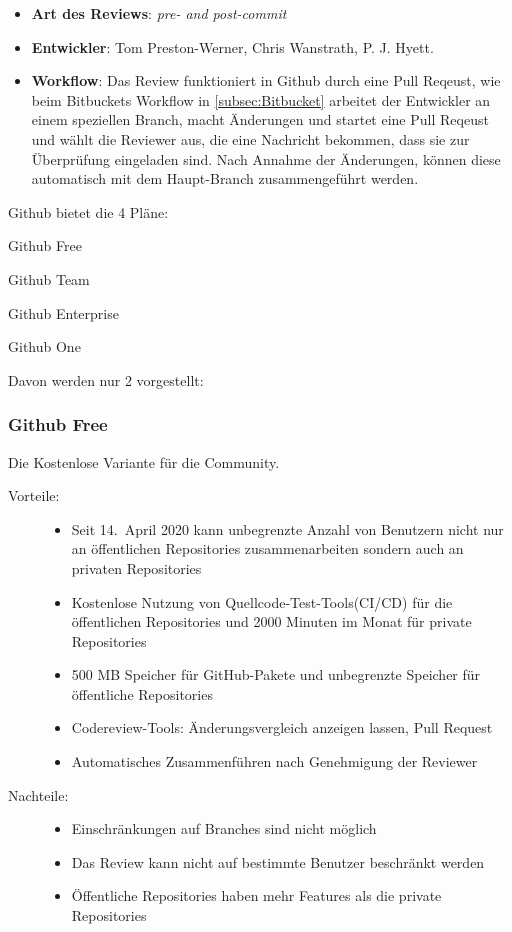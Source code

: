 \begin{itemize}
	\item \textbf{Art des Reviews}: \textit{pre- and post-commit}
	\item \textbf{Entwickler}: Tom Preston-Werner, Chris Wanstrath, P. J. Hyett.
	\item \textbf{Workflow}: Das Review funktioniert in Github durch eine Pull Reqeust, wie beim Bitbuckets Workflow in \cref{subsec:Bitbucket} arbeitet der Entwickler an einem
		speziellen Branch, macht Änderungen und startet eine Pull Reqeust und wählt die Reviewer aus, die eine Nachricht bekommen, dass sie zur Überprüfung eingeladen sind. Nach Annahme der
		Änderungen, können diese automatisch mit dem Haupt-Branch zusammengeführt werden.
\end{itemize}

Github bietet die 4 Pläne:
\begin{compactitem}
	\item Github Free
	\item Github Team
	\item Github Enterprise
	\item Github One
\end{compactitem}
Davon werden nur 2 vorgestellt:

\subsubsection{Github Free}
\label{subsubsec:Free}

Die Kostenlose Variante für die Community.

\begin{description}
	\item [Vorteile:] \hfill
	\begin{itemize}
		\item Seit 14.~April 2020 kann unbegrenzte Anzahl von Benutzern nicht nur an öffentlichen Repositories zusammenarbeiten sondern auch an privaten Repositories
		\item Kostenlose Nutzung von Quellcode-Test-Tools(\ac{CI}/\ac{CD}) für die öffentlichen Repositories und 2000 Minuten im Monat für private Repositories
		\item 500 MB Speicher für GitHub-Pakete und unbegrenzte Speicher für öffentliche Repositories
		\item Codereview-Tools: Änderungsvergleich anzeigen lassen, Pull Request
		\item Automatisches Zusammenführen nach Genehmigung der Reviewer
	\end{itemize}
	
	\item [Nachteile:] \hfill
	\begin{itemize}
		\item Einschränkungen auf Branches sind nicht möglich
		\item Das Review kann nicht auf bestimmte Benutzer beschränkt werden
		\item Öffentliche Repositories haben mehr Features als die private Repositories
	\end{itemize}
\end{description}

